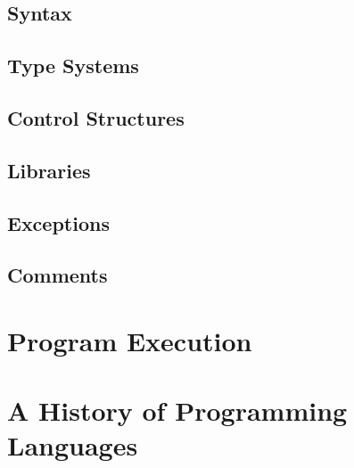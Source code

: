 
\subsection{Syntax}


\subsection{Type Systems}


\subsection{Control Structures}


\subsection{Libraries}


\subsection{Exceptions}


\subsection{Comments}


\toclineskip
\section{Program Execution}


\toclineskip
\section{A History of Programming Languages}

